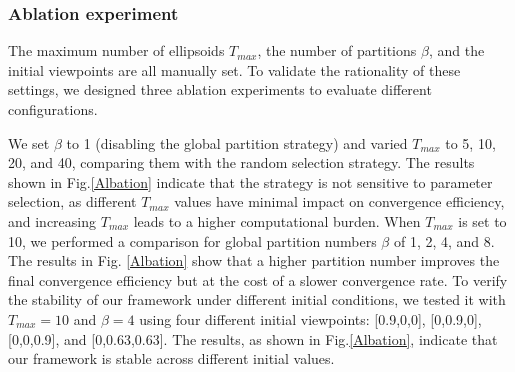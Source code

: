 \subsubsection{Ablation experiment}
The maximum number of ellipsoids \(T_{max}\), the number of partitions \(\beta\), and the initial viewpoints are all manually set. To validate the rationality of these settings, we designed three ablation experiments to evaluate different configurations.

We set \(\beta\) to 1 (disabling the global partition strategy) and varied \(T_{max}\) to 5, 10, 20, and 40, comparing them with the random selection strategy. The results shown in Fig.\ref{Albation} indicate that the strategy is not sensitive to parameter selection, as different \(T_{max}\) values have minimal impact on convergence efficiency, and increasing \(T_{max}\) leads to a higher computational burden.
When \(T_{max}\) is set to 10, we performed a comparison for global partition numbers \(\beta\) of 1, 2, 4, and 8. The results in Fig. \ref{Albation}  show that a higher partition number improves the final convergence efficiency but at the cost of a slower convergence rate.
To verify the stability of our framework under different initial conditions, we tested it with \(T_{max}=10\) and \(\beta=4\) using four different initial viewpoints: [0.9,0,0], [0,0.9,0], [0,0,0.9], and [0,0.63,0.63]. The results, as shown in Fig.\ref{Albation}, indicate that our framework is stable across different initial values.
